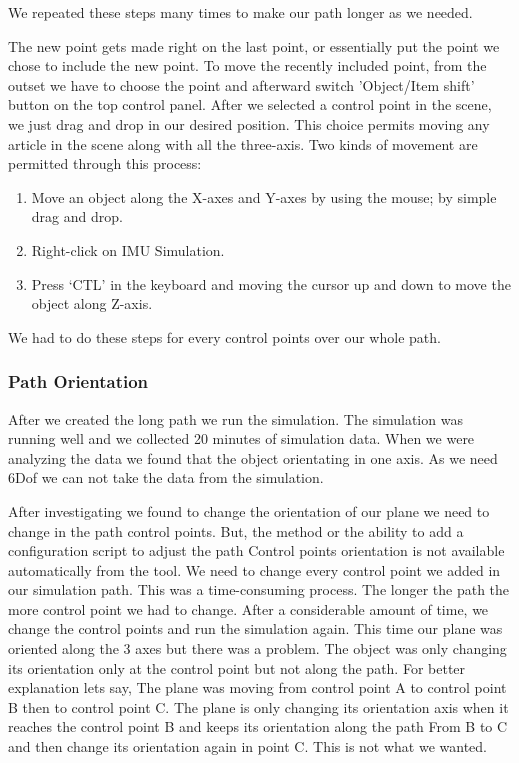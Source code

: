 We repeated these steps many times to make our path longer as we needed. 

The new point gets made right on the last point, or essentially put the point we chose to include the new point. To move the recently included point, from the outset we have to choose the point and afterward switch 'Object/Item shift' button on the top control panel. After we selected a control point in the scene, we just drag and drop in our desired position. This choice permits moving any article in the scene along with all the three-axis. Two kinds of movement are permitted through this process:

\begin{enumerate}
  \item Move an object along the X-axes and Y-axes by using the mouse; by simple drag and drop.
  \item Right-click on IMU Simulation.
  \item Press ‘CTL’ in the keyboard and moving the cursor up and down to move the object along Z-axis.
\end{enumerate}

We had to do these steps for every control points over our whole path.


\subsubsection{Path Orientation}

After we created the long path we run the simulation. The simulation was running well and we collected 20 minutes of simulation data. When we were analyzing the data we found that the object orientating in one axis. As we need 6Dof we can not take the data from the simulation. 

After investigating we found to change the orientation of our plane we need to change in the path control points. But, the method or the ability to add a configuration script to adjust the path Control points orientation is not available automatically from the tool. We need to change every control point we added in our simulation path. This was a time-consuming process. The longer the path the more control point we had to change. After a considerable amount of time, we change the control points and run the simulation again. This time our plane was oriented along the 3 axes but there was a problem. The object was only changing its orientation only at the control point but not along the path. For better explanation lets say, The plane was moving from control point A to control point B then to control point C. The plane is only changing its orientation axis when it reaches the control point B and keeps its orientation along the path From B to C and then change its orientation again in point C. This is not what we wanted.

